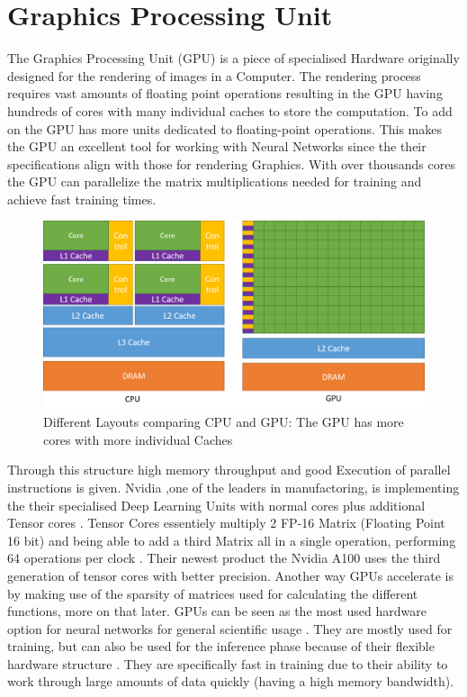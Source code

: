 \documentclass[conference]{IEEEtran}
\begin{document}
\section{Graphics Processing Unit}
The Graphics Processing Unit (GPU) is a piece of specialised Hardware originally designed for the rendering of images in a Computer. The rendering process requires vast amounts of floating point operations resulting in the GPU having hundreds of cores with many individual caches to store the computation. To add on the GPU has more units dedicated to floating-point operations. This makes the GPU an excellent tool for working with Neural Networks since the their specifications align with those for rendering Graphics. With over thousands cores the GPU can parallelize the matrix multiplications needed for training and achieve fast training times. 
\begin{figure}[h]
	\caption{Different Layouts comparing CPU and GPU: The GPU has more cores with more individual Caches \cite{intelpic_comparison}}
	\centering
	\includegraphics[width=\linewidth]{pictures/intel_comparison.png}
\end{figure}

Through this structure high memory throughput and good Execution of parallel instructions is given. Nvidia ,one of the leaders in manufactoring, is implementing the their specialised Deep Learning Units with normal cores plus additional Tensor cores \cite{nvidiav100}. Tensor Cores essentiely multiply 2 FP-16 Matrix (Floating Point 16 bit) and being able to add a third Matrix all in a single operation, performing 64 operations per clock \cite{tensorcores}. Their newest product the Nvidia A100 uses the third generation of tensor cores with better precision.
Another way GPUs accelerate is by making use of the sparsity of matrices used for calculating the different functions, more on that later.
GPUs can be seen as the most used hardware option for neural networks for general scientific usage \cite{mostusedgpu}. They are mostly used for training, but can also be used for the inference phase because of their flexible hardware structure \cite{capra2020updated}. They are specifically fast in training due to their ability to work through large amounts of data quickly (having a high memory bandwidth).
\\
\end{document}
